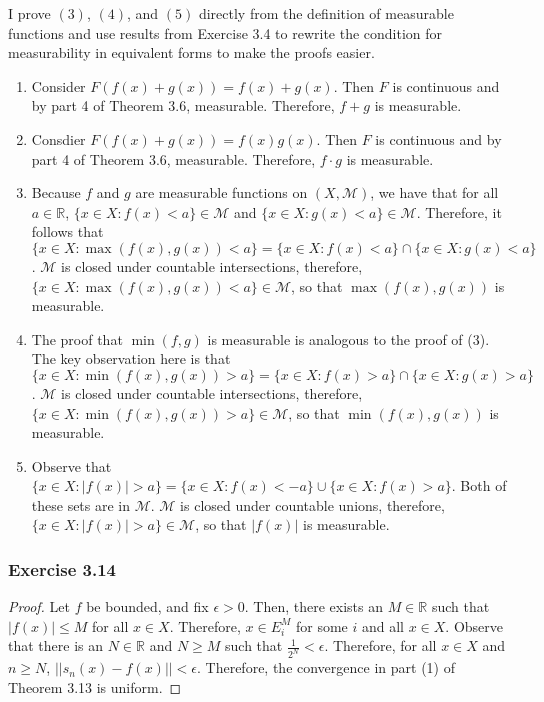 \documentclass[letterpaper,12pt]{article}
\theoremstyle{definition}
\begin{document}
I prove $(3)$, $(4)$, and $(5)$ directly from the definition of measurable functions and use results from Exercise 3.4 to rewrite the condition for measurability in equivalent forms to make the proofs easier.

\begin{enumerate}
  \item Consider $F(f(x) + g(x)) = f(x) + g(x)$. Then $F$ is continuous and by part 4 of Theorem 3.6, measurable. Therefore, $f + g$ is measurable.
  \item Consdier $F(f(x) + g(x)) = f(x)g(x)$. Then $F$ is continuous and by part 4 of Theorem 3.6, measurable. Therefore, $f \cdot g$ is measurable.
  \item Because $f$ and $g$ are measurable functions on $(X,\mathcal{M})$, we have that for all $a \in \mathbb{R}$, $\{x \in X : f(x) < a \} \in \mathcal{M}$ and $\{x \in X : g(x) < a \} \in \mathcal{M}$. Therefore, it follows that $\{x \in X : \max(f(x),g(x)) < a \} = \{x \in X : f(x) < a \} \cap \{x \in X : g(x) < a \}$. $\mathcal{M}$ is closed under countable intersections, therefore, $\{x \in X : \max(f(x),g(x)) < a \} \in \mathcal{M}$, so that $\max(f(x), g(x))$ is measurable.
  \item The proof that $\min(f,g)$ is measurable is analogous to the proof of (3). The key observation here is that $\{x \in X : \min(f(x),g(x)) > a \} = \{x \in X : f(x) > a \} \cap \{x \in X : g(x) > a \}$. $\mathcal{M}$ is closed under countable intersections, therefore, $\{x \in X : \min(f(x),g(x)) > a \} \in \mathcal{M}$, so that $\min(f(x), g(x))$ is measurable.
  \item Observe that $\{x \in X : |f(x)| > a \} = \{x \in X : f(x) < -a \} \cup \{x \in X : f(x) > a \}$. Both of these sets are in $\mathcal{M}$. $\mathcal{M}$ is closed under countable unions, therefore, $\{x \in X : |f(x)| > a \} \in \mathcal{M}$, so that $|f(x)|$ is measurable.
\end{enumerate}

\subsubsection*{Exercise 3.14}
\begin{proof}
 Let $f$ be bounded, and fix $\epsilon > 0$. Then, there exists an $M \in \mathbb{R}$ such that $|f(x)| \leq M$ for all $x \in X$. Therefore, $x \in E^M_i$ for some $i$ and all $x \in X$. Observe that there is an $N \in \mathbb{R}$ and $N \geq M$ such that $\frac{1}{2^N} < \epsilon$. Therefore, for all $x \in X$ and $n \geq N$, $|| s_n(x) - f(x) || < \epsilon$. Therefore, the convergence in part (1) of Theorem 3.13 is uniform.
\end{proof}
\end{document}
